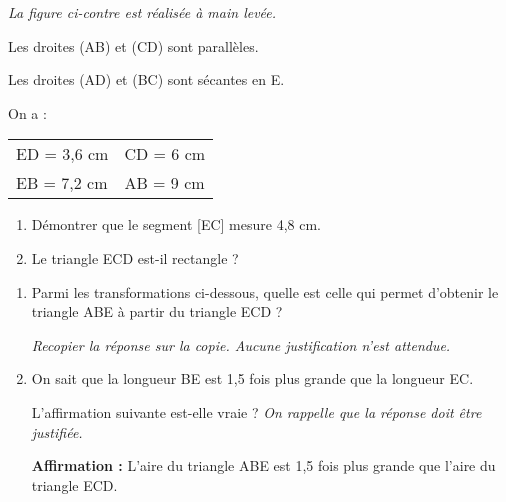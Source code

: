 
\medskip

\begin{minipage}[t]{10cm}
\emph{La figure ci-contre est réalisée à main levée.}

Les droites (AB) et (CD) sont parallèles.

Les droites (AD) et (BC) sont sécantes en E.

On a : \begin{tabular}[t]{ll}
	ED = 3,6 cm & CD = 6 cm \\
	EB = 7,2 cm & AB = 9 cm
\end{tabular}

\begin{enumerate}
	\item Démontrer que le segment [EC] mesure 4,8 cm.

	\item Le triangle ECD est-il rectangle ?
\end{enumerate}
\end{minipage}
\hfill
{}

\begin{enumerate}[resume]
	\item Parmi les transformations ci-dessous, quelle est celle qui permet d’obtenir le triangle ABE à partir du triangle ECD ?

	\emph{Recopier la réponse sur la copie. Aucune justification n’est attendue.}

\begin{center}\quad  {}\quad  {}\quad  {}\quad  {}\end{center}
	\item On sait que la longueur BE est 1,5 fois plus grande que la longueur EC.

	L’affirmation suivante est-elle vraie ? \emph{On rappelle que la réponse doit être justifiée.}

	\textbf{Affirmation :} \og L’aire du triangle ABE est 1,5 fois plus grande que l’aire du triangle ECD. \fg
\end{enumerate}


